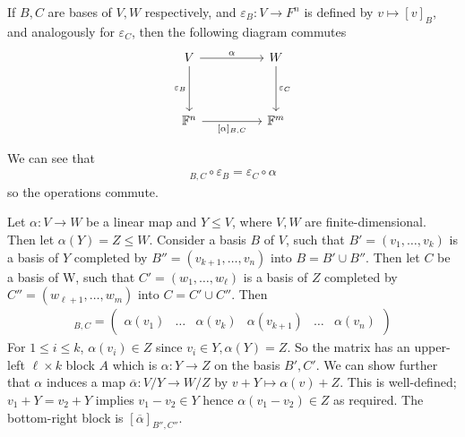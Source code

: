     \begin{remark}
        If $B,C$ are bases of $V,W$ respectively, and $\varepsilon_B \colon V \to F^n$ is defined by $v \mapsto [v]_B$, and analogously for $\varepsilon_C$, then the following diagram \color{blue}commutes\color{black}
        \[\begin{tikzcd}
            V && W \\
            \\
            {\mathbb{F}^n} && {\mathbb{F}^m}
            \arrow["\alpha", from=1-1, to=1-3]
            \arrow["{\varepsilon_C}", from=1-3, to=3-3]
            \arrow["{[\alpha]_{B,C}}"', from=3-1, to=3-3]
            \arrow["{\varepsilon_B}"', from=1-1, to=3-1]
        \end{tikzcd}\]

        We can see that
        \begin{align*}
            [\alpha]_{B,C} \circ \varepsilon_B = \varepsilon_C \circ \alpha
        \end{align*}
        so the operations commute.
    \end{remark}
    \begin{example}
        Let $\alpha \colon V \to W$ be a linear map and $Y \leq V$, where $V, W$ are finite-dimensional.
        Then let $\alpha(Y) = Z \leq W$.
        Consider a basis $B$ of $V$, such that $B' = (v_1, \dots, v_k)$ is a basis of $Y$ completed by $B'' = (v_{k+1}, \dots, v_n)$ into $B = B' \cup B''$.
        Then let $C$ be a basis of W, such that $C' = (w_1, \dots, w_\ell)$ is a basis of $Z$ completed by $C'' = (w_{\ell + 1}, \dots, w_m)$ into $C = C' \cup C''$.
        Then
        \begin{align*}
            [\alpha]_{B,C} = \begin{pmatrix}
                \alpha(v_1) & \dots & \alpha(v_k) & \alpha(v_{k+1}) & \dots & \alpha(v_n)
            \end{pmatrix}
        \end{align*}
        For $1 \leq i \leq k$, $\alpha(v_i) \in Z$ since $v_i \in Y, \alpha(Y) = Z$.
        So the matrix has an upper-left $\ell \times k$ block $A$ which is $\alpha \colon Y \to Z$ on the basis $B', C'$.
        We can show further that $\alpha$ induces a map $\overline{\alpha} \colon V / Y \to W / Z$ by $v + Y \mapsto \alpha(v) + Z$.
        This is well-defined; $v_1 + Y = v_2 + Y$ implies $v_1 - v_2 \in Y$ hence $\alpha(v_1 - v_2) \in Z$ as required.
        The bottom-right block is $[\overline{\alpha}]_{B'', C''}$.
    \end{example}

